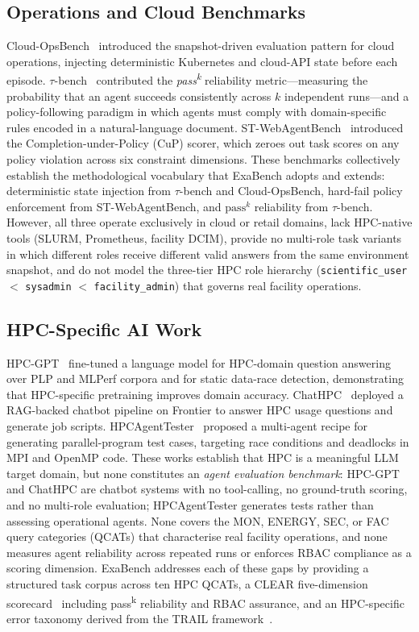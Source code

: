 \documentclass[12pt]{article}
\begin{document}
\subsection*{Operations and Cloud Benchmarks}

Cloud-OpsBench~\citep{cloud-opsbench} introduced the snapshot-driven
evaluation pattern for cloud operations, injecting deterministic Kubernetes
and cloud-API state before each episode.
$\tau$-bench~\citep{tau-bench} contributed the
\emph{pass\textsuperscript{k}} reliability metric---measuring the
probability that an agent succeeds consistently across $k$ independent
runs---and a policy-following paradigm in which agents must comply with
domain-specific rules encoded in a natural-language document.
ST-WebAgentBench~\citep{st-webagentbench} introduced the
Completion-under-Policy (CuP) scorer, which zeroes out task scores
on any policy violation across six constraint dimensions.
These benchmarks collectively establish the methodological vocabulary that
ExaBench adopts and extends: deterministic state injection from
$\tau$-bench and Cloud-OpsBench, hard-fail policy enforcement from
ST-WebAgentBench, and $\text{pass}^k$ reliability from $\tau$-bench.
However, all three operate exclusively in cloud or retail domains, lack
HPC-native tools (SLURM, Prometheus, facility DCIM), provide no multi-role
task variants in which different roles receive different valid answers from
the same environment snapshot, and do not model the three-tier HPC role
hierarchy (\texttt{scientific\_user} $<$ \texttt{sysadmin} $<$
\texttt{facility\_admin}) that governs real facility operations.

\subsection*{HPC-Specific AI Work}

HPC-GPT~\citep{hpc-gpt} fine-tuned a language model for HPC-domain question
answering over PLP and MLPerf corpora and for static data-race detection,
demonstrating that HPC-specific pretraining improves domain accuracy.
ChatHPC~\citep{chathpc} deployed a RAG-backed chatbot pipeline on Frontier
to answer HPC usage questions and generate job scripts.
HPCAgentTester~\citep{hpcagenttester} proposed a multi-agent recipe for
generating parallel-program test cases, targeting race conditions and
deadlocks in MPI and OpenMP code.
These works establish that HPC is a meaningful LLM target domain, but none
constitutes an \emph{agent evaluation benchmark}: HPC-GPT and ChatHPC are
chatbot systems with no tool-calling, no ground-truth scoring, and no
multi-role evaluation; HPCAgentTester generates tests rather than assessing
operational agents.
None covers the MON, ENERGY, SEC, or FAC query categories (QCATs) that
characterise real facility operations, and none measures agent reliability
across repeated runs or enforces RBAC compliance as a scoring dimension.
ExaBench addresses each of these gaps by providing a structured task corpus
across ten HPC QCATs, a CLEAR five-dimension scorecard~\citep{clear}
including pass\textsuperscript{k} reliability and RBAC assurance, and an
HPC-specific error taxonomy derived from the TRAIL framework~\citep{trail}.
\end{document}
